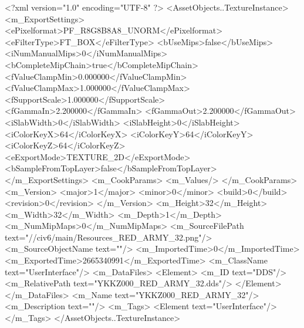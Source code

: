 <?xml version="1.0" encoding="UTF-8" ?>
<AssetObjects..TextureInstance>
	<m_ExportSettings>
		<ePixelformat>PF_R8G8B8A8_UNORM</ePixelformat>
		<eFilterType>FT_BOX</eFilterType>
		<bUseMips>false</bUseMips>
		<iNumManualMips>0</iNumManualMips>
		<bCompleteMipChain>true</bCompleteMipChain>
		<fValueClampMin>0.000000</fValueClampMin>
		<fValueClampMax>1.000000</fValueClampMax>
		<fSupportScale>1.000000</fSupportScale>
		<fGammaIn>2.200000</fGammaIn>
		<fGammaOut>2.200000</fGammaOut>
		<iSlabWidth>0</iSlabWidth>
		<iSlabHeight>0</iSlabHeight>
		<iColorKeyX>64</iColorKeyX>
		<iColorKeyY>64</iColorKeyY>
		<iColorKeyZ>64</iColorKeyZ>
		<eExportMode>TEXTURE_2D</eExportMode>
		<bSampleFromTopLayer>false</bSampleFromTopLayer>
	</m_ExportSettings>
	<m_CookParams>
		<m_Values/>
	</m_CookParams>
	<m_Version>
		<major>1</major>
		<minor>0</minor>
		<build>0</build>
		<revision>0</revision>
	</m_Version>
	<m_Height>32</m_Height>
	<m_Width>32</m_Width>
	<m_Depth>1</m_Depth>
	<m_NumMipMaps>0</m_NumMipMaps>
	<m_SourceFilePath text="//civ6/main/Resources_RED_ARMY_32.png"/>
	<m_SourceObjectName text=""/>
	<m_ImportedTime>0</m_ImportedTime>
	<m_ExportedTime>2665340991</m_ExportedTime>
	<m_ClassName text="UserInterface"/>
	<m_DataFiles>
		<Element>
			<m_ID text="DDS"/>
			<m_RelativePath text="YKKZ000_RED_ARMY_32.dds"/>
		</Element>
	</m_DataFiles>
	<m_Name text="YKKZ000_RED_ARMY_32"/>
	<m_Description text=""/>
	<m_Tags>
		<Element text="UserInterface"/>
	</m_Tags>
</AssetObjects..TextureInstance>

